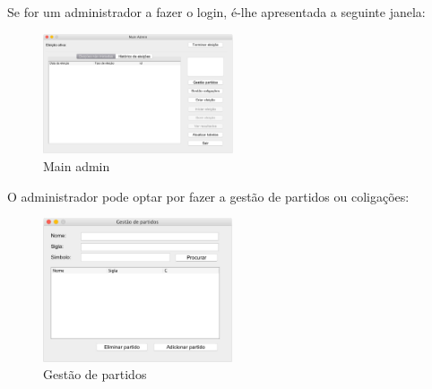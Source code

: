 \documentclass[a4paper,12pt]{report}
\begin{document}
Se for um administrador a fazer o login, é-lhe apresentada a seguinte janela:
\begin{figure}[H]
\begin{center}
	\includegraphics[width=0.5\textwidth]{media/img_interface/img9.jpg}
	 \caption{Main admin}
\end{center}
\end{figure}
O administrador pode optar por fazer a gestão de partidos ou coligações:
\begin{figure}[H]
\begin{center}
	\includegraphics[width=0.5\textwidth]{media/img_interface/img3.jpg}
	 \caption{Gestão de partidos}
\end{center}
\end{figure}
\end{document}
